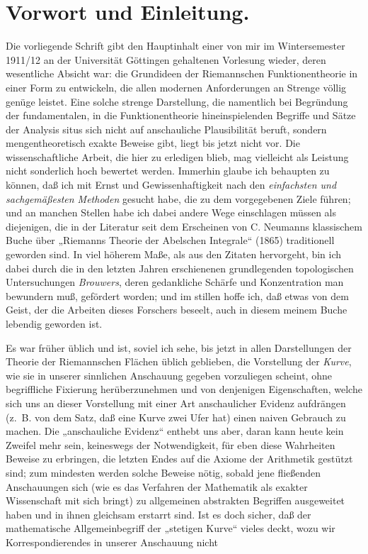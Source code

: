\documentclass{article}
\begin{document}

\section*{Vorwort und Einleitung.}

Die vorliegende Schrift gibt den Hauptinhalt einer von mir im Wintersemester 1911/12 an der Universität Göttingen gehaltenen Vorlesung wieder, deren wesentliche Absicht war: die Grundideen der Riemannschen Funktionentheorie in einer Form zu entwickeln, die allen modernen Anforderungen an Strenge völlig genüge leistet. Eine solche strenge Darstellung, die namentlich bei Begründung der fundamentalen, in die Funktionentheorie hineinspielenden Begriffe und Sätze der Analysis situs sich nicht auf anschauliche Plausibilität beruft, sondern mengentheoretisch exakte Beweise gibt, liegt bis jetzt nicht vor. Die wissenschaftliche Arbeit, die hier zu erledigen blieb, mag vielleicht als Leistung nicht sonderlich hoch bewertet werden. Immerhin glaube ich behaupten zu können, daß ich mit Ernst und Gewissenhaftigkeit nach den \emph{einfachsten und sachgemäßesten Methoden} gesucht habe, die zu dem vorgegebenen Ziele führen; und an manchen Stellen habe ich dabei andere Wege einschlagen müssen als diejenigen, die in der Literatur seit dem Erscheinen von C. Neumanns klassischem Buche über „Riemanns Theorie der Abelschen Integrale“ (1865) traditionell geworden sind. In viel höherem Maße, als aus den Zitaten hervorgeht, bin ich dabei durch die in den letzten Jahren erschienenen grundlegenden topologischen Untersuchungen \emph{Brouwers}, deren gedankliche Schärfe und Konzentration man bewundern muß, gefördert worden; und im stillen hoffe ich, daß etwas von dem Geist, der die Arbeiten dieses Forschers beseelt, auch in diesem meinem Buche lebendig geworden ist.

Es war früher üblich und ist, soviel ich sehe, bis jetzt in allen Darstellungen der Theorie der Riemannschen Flächen üblich geblieben, die Vorstellung der \emph{Kurve}, wie sie in unserer sinnlichen Anschauung gegeben vorzuliegen scheint, ohne begriffliche Fixierung herüberzunehmen und von denjenigen Eigenschaften, welche sich uns an dieser Vorstellung mit einer Art anschaulicher Evidenz aufdrängen (z.~B. von dem Satz, daß eine Kurve zwei Ufer hat) einen naiven Gebrauch zu machen. Die „anschauliche Evidenz“ enthebt uns aber, daran kann heute kein Zweifel mehr sein, keineswegs der Notwendigkeit, für eben diese Wahrheiten Beweise zu erbringen, die letzten Endes auf die Axiome der Arithmetik gestützt sind; zum mindesten werden solche Beweise nötig, sobald jene fließenden Anschauungen sich (wie es das Verfahren der Mathematik als exakter Wissenschaft mit sich bringt) zu allgemeinen abstrakten Begriffen ausgeweitet haben und in ihnen gleichsam erstarrt sind. Ist es doch sicher, daß der mathematische Allgemeinbegriff der „stetigen Kurve“ vieles deckt, wozu wir Korrespondierendes in unserer Anschauung nicht
\end{document}
